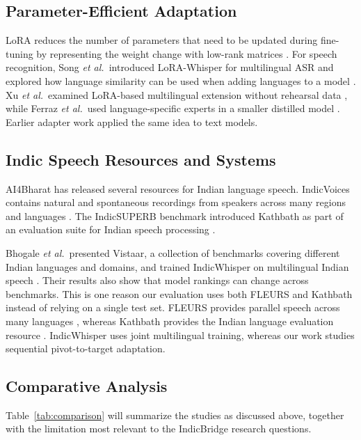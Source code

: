 \documentclass[conference]{IEEEtran}
\begin{document}
\subsection{Parameter-Efficient Adaptation}

LoRA reduces the number of parameters that need to be updated during
fine-tuning by representing the weight change with low-rank matrices
\cite{hu2022lora}. For speech recognition, Song \emph{et al.}\ introduced
LoRA-Whisper for multilingual ASR and explored how language similarity
can be used when adding languages to a model \cite{song2024lorawhisper}.
Xu \emph{et al.}\ examined LoRA-based multilingual extension without
rehearsal data \cite{xu2024rehearsalfree}, while Ferraz \emph{et al.}\
used language-specific experts in a smaller distilled model
\cite{ferraz2024distilwhisper}. Earlier adapter work
\cite{houlsby2019adapters,pfeiffer2020madx} applied the same idea to
text models.

\subsection{Indic Speech Resources and Systems}

AI4Bharat has released several resources for Indian language speech.
IndicVoices contains natural and spontaneous recordings from speakers
across many regions and languages \cite{javed2024indicvoices}. The
IndicSUPERB benchmark introduced Kathbath as part of an evaluation suite
for Indian speech processing \cite{javed2023indicsuperb}.

Bhogale \emph{et al.}\ presented Vistaar, a collection of benchmarks covering different Indian languages and domains, and trained IndicWhisper on multilingual Indian speech \cite{bhogale2023vistaar}. Their results also show that model rankings can change across benchmarks. This is one reason our evaluation uses both FLEURS and Kathbath instead of relying on a single test set. FLEURS provides parallel speech across many languages \cite{conneau2023fleurs}, whereas Kathbath provides the Indian language evaluation resource \cite{javed2023indicsuperb}. IndicWhisper uses joint multilingual training, whereas our work studies sequential pivot-to-target adaptation.

\subsection{Comparative Analysis}

Table~\ref{tab:comparison} will summarize the studies as discussed above, together with the limitation most relevant to the IndicBridge research questions.
\end{document}
